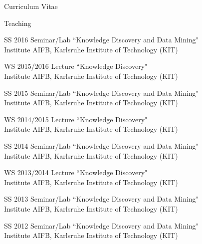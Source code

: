 \begin{cv}{\centerline{\LARGE Curriculum Vitae}}
\setlength{\cvlabelwidth}{47mm} 
  \begin{cvlist}{Teaching}
  \item[SS 2016] Seminar/Lab ``Knowledge Discovery and Data Mining" \\
  Institute AIFB, Karlsruhe Institute of Technology (KIT)
  \item[WS 2015/2016] Lecture ``Knowledge Discovery" \\
  Institute AIFB, Karlsruhe Institute of Technology (KIT)
  \item[SS 2015] Seminar/Lab ``Knowledge Discovery and Data Mining" \\
  Institute AIFB, Karlsruhe Institute of Technology (KIT)
  \item[WS 2014/2015] Lecture ``Knowledge Discovery" \\
  Institute AIFB, Karlsruhe Institute of Technology (KIT)
  \item[SS 2014] Seminar/Lab ``Knowledge Discovery and Data Mining" \\
  Institute AIFB, Karlsruhe Institute of Technology (KIT)
  \item[WS 2013/2014] Lecture ``Knowledge Discovery" \\
  Institute AIFB, Karlsruhe Institute of Technology (KIT)
  \item[SS 2013] Seminar/Lab ``Knowledge Discovery and Data Mining" \\
  Institute AIFB, Karlsruhe Institute of Technology (KIT)
  \item[SS 2012] Seminar/Lab ``Knowledge Discovery and Data Mining" \\
  Institute AIFB, Karlsruhe Institute of Technology (KIT)
  \end{cvlist}

%  



\end{cv}